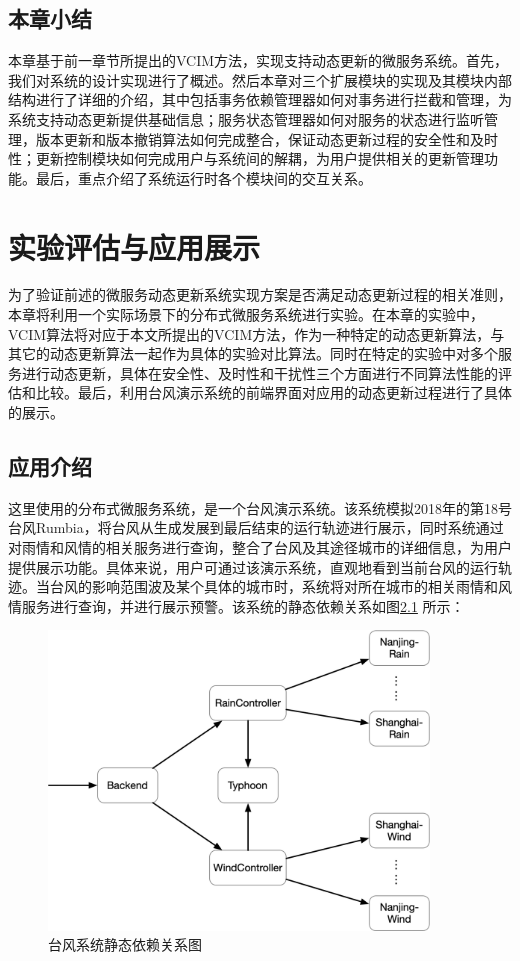 \documentclass[macfonts,master]{njuthesis}
\begin{document}
\section{本章小结}
本章基于前一章节所提出的VCIM方法，实现支持动态更新的微服务系统。首先，我们对系统的设计实现进行了概述。然后本章对三个扩展模块的实现及其模块内部结构进行了详细的介绍，其中包括事务依赖管理器如何对事务进行拦截和管理，为系统支持动态更新提供基础信息；服务状态管理器如何对服务的状态进行监听管理，版本更新和版本撤销算法如何完成整合，保证动态更新过程的安全性和及时性；更新控制模块如何完成用户与系统间的解耦，为用户提供相关的更新管理功能。最后，重点介绍了系统运行时各个模块间的交互关系。

\chapter{实验评估与应用展示}\label{chapter_experiments}
为了验证前述的微服务动态更新系统实现方案是否满足动态更新过程的相关准则，本章将利用一个实际场景下的分布式微服务系统进行实验。在本章的实验中，VCIM算法将对应于本文所提出的VCIM方法，作为一种特定的动态更新算法，与其它的动态更新算法一起作为具体的实验对比算法。同时在特定的实验中对多个服务进行动态更新，具体在安全性、及时性和干扰性三个方面进行不同算法性能的评估和比较。最后，利用台风演示系统的前端界面对应用的动态更新过程进行了具体的展示。

\section{应用介绍}
这里使用的分布式微服务系统，是一个台风演示系统。该系统模拟2018年的第18号台风Rumbia，将台风从生成发展到最后结束的运行轨迹进行展示，同时系统通过对雨情和风情的相关服务进行查询，整合了台风及其途径城市的详细信息，为用户提供展示功能。具体来说，用户可通过该演示系统，直观地看到当前台风的运行轨迹。当台风的影响范围波及某个具体的城市时，系统将对所在城市的相关雨情和风情服务进行查询，并进行展示预警。该系统的静态依赖关系如图\ref{fig:typhoon_example} 所示：

\begin{figure}[!htbp]
  \centering
  \includegraphics[width= 0.9\textwidth]{image/typhoon_example.png}
  \caption{台风系统静态依赖关系图}
  \label{fig:typhoon_example}
\end{figure}
\end{document}
